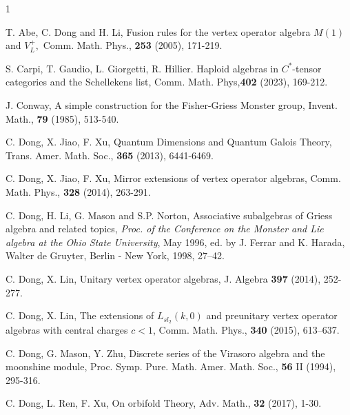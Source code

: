 \documentclass{article}
\begin{document}
\begin{thebibliography}{1}
	
	T. Abe,  C. Dong and H. Li, Fusion rules for the vertex operator algebra $M(1)$ and $V_L^+,$  Comm. Math. Phys., {\bf 253} (2005), 171-219.
	
	S. Carpi, T. Gaudio, L. Giorgetti, R. Hillier. Haploid algebras in $ C^*$-tensor categories and the Schellekens list, Comm. Math. Phys,{\bf 402} (2023), 169-212.
	
	
	J. Conway, A simple construction for the Fisher-Griess Monster group,  Invent. Math., {\bf 79} (1985), 513-540.
	
	C. Dong, X. Jiao, F. Xu, Quantum Dimensions and Quantum Galois Theory, Trans. Amer. Math. Soc., \textbf{365} (2013), 6441-6469.
	
	C. Dong, X. Jiao, F. Xu, Mirror extensions of vertex operator algebras, Comm. Math. Phys., \textbf{328} (2014), 263-291.
	
	  C. Dong, H. Li, G. Mason and S.P. Norton, Associative
	subalgebras of Griess algebra and related topics, \emph{Proc. of
		the Conference on the Monster and Lie algebra at the Ohio State
		University}, May 1996, ed. by J. Ferrar and K. Harada, Walter de
	Gruyter, Berlin - New York, 1998, 27--42.
	
	
	C. Dong, X. Lin,  Unitary vertex operator algebras, J. Algebra \textbf{397} (2014), 252-277.
	
	 C. Dong, X. Lin,
	The extensions of {$L_{sl_2}(k,0)$} and preunitary vertex operator algebras with central charges {$c<1$},
	Comm. Math. Phys., {\bf 340} (2015), 613--637.
	
	C. Dong, G. Mason, Y. Zhu, Discrete series of the Virasoro algebra and the moonshine module, Proc. Symp. Pure. Math. Amer. Math. Soc., \textbf{56} II (1994), 295-316.
	
	
	 C. Dong, L. Ren, F. Xu, On orbifold Theory,  Adv. Math., {\bf 32} (2017), 1-30.
	

\end{thebibliography}
\end{document}
